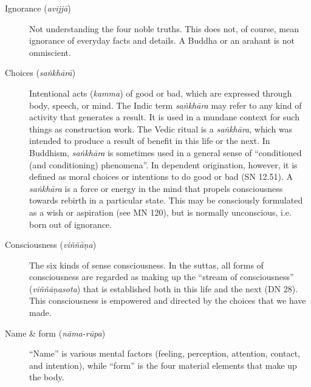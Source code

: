 \documentclass[12pt,openany]{book}%
\begin{document}
\begin{description}%
\item[Ignorance (\textit{\textsanskrit{avijjā}})] Not understanding the four noble truths.
This does not, of course, mean ignorance of everyday facts and details. A Buddha or an arahant is not omniscient.%
\item[Choices (\textit{\textsanskrit{saṅkhārā}})] Intentional acts (\textit{kamma}) of good or bad, which are expressed through body, speech, or mind.
The Indic term \emph{\textsanskrit{saṅkhāra}} may refer to any kind of activity that generates a result. It is used in a mundane context for such things as construction work. The Vedic ritual is a \emph{\textsanskrit{saṅkhāra}}, which was intended to produce a result of benefit in this life or the next. In Buddhism, \emph{\textsanskrit{saṅkhāra}} is sometimes used in a general sense of “conditioned (and conditioning) phenomena”. In dependent origination, however, it is defined as moral choices or intentions to do good or bad (SN 12.51). A \emph{\textsanskrit{saṅkhāra}} is a force or energy in the mind that propels consciousness towards rebirth in a particular state. This may be consciously formulated as a wish or aspiration (see MN 120), but is normally unconscious, i.e. born out of ignorance.%
\item[Consciousness (\textit{\textsanskrit{viññāṇa}})] The six kinds of sense consciousness.
In the suttas, all forms of consciousness are regarded as making up the “stream of consciousness” (\textit{\textsanskrit{viññāṇasota}}) that is established both in this life and the next (DN 28). This consciousness is empowered and directed by the choices that we have made.%
\item[Name \& form (\textit{\textsanskrit{nāma}-\textsanskrit{rūpa}})] “Name” is various mental factors (feeling, perception, attention, contact, and intention), while “form” is the four material elements that make up the body.

\end{description}
\end{document}
